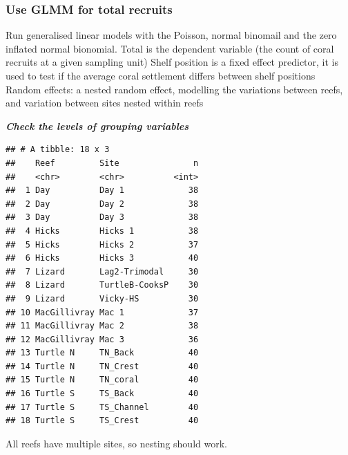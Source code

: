 \documentclass[
]{article}
\begin{document}
\subsubsection{Use GLMM for total
recruits}\label{use-glmm-for-total-recruits}

Run generalised linear models with the Poisson, normal binomail and the
zero inflated normal bionomial. Total is the dependent variable (the
count of coral recruits at a given sampling unit) Shelf position is a
fixed effect predictor, it is used to test if the average coral
settlement differs between shelf positions Random effects: a nested
random effect, modelling the variations between reefs, and variation
between sites nested within reefs

\textbf{\emph{Check the levels of grouping variables}}

\begin{verbatim}
## # A tibble: 18 x 3
##    Reef         Site               n
##    <chr>        <chr>          <int>
##  1 Day          Day 1             38
##  2 Day          Day 2             38
##  3 Day          Day 3             38
##  4 Hicks        Hicks 1           38
##  5 Hicks        Hicks 2           37
##  6 Hicks        Hicks 3           40
##  7 Lizard       Lag2-Trimodal     30
##  8 Lizard       TurtleB-CooksP    30
##  9 Lizard       Vicky-HS          30
## 10 MacGillivray Mac 1             37
## 11 MacGillivray Mac 2             38
## 12 MacGillivray Mac 3             36
## 13 Turtle N     TN_Back           40
## 14 Turtle N     TN_Crest          40
## 15 Turtle N     TN_coral          40
## 16 Turtle S     TS_Back           40
## 17 Turtle S     TS_Channel        40
## 18 Turtle S     TS_Crest          40
\end{verbatim}

All reefs have multiple sites, so nesting should work.
\end{document}
